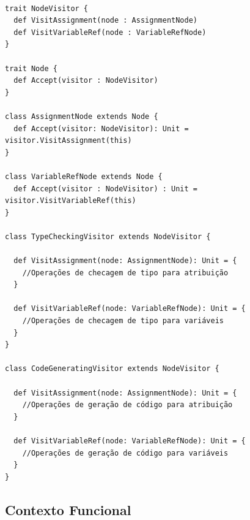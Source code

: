 \begin{lstlisting}[caption={Visitor Orientação a Objetos},label=oovisitor]

trait NodeVisitor {
  def VisitAssignment(node : AssignmentNode)
  def VisitVariableRef(node : VariableRefNode)
}

trait Node {
  def Accept(visitor : NodeVisitor)
}

class AssignmentNode extends Node {
  def Accept(visitor: NodeVisitor): Unit = visitor.VisitAssignment(this)
}

class VariableRefNode extends Node {
  def Accept(visitor : NodeVisitor) : Unit = visitor.VisitVariableRef(this)
}

class TypeCheckingVisitor extends NodeVisitor {

  def VisitAssignment(node: AssignmentNode): Unit = {
    //Operações de checagem de tipo para atribuição
  }

  def VisitVariableRef(node: VariableRefNode): Unit = {
    //Operações de checagem de tipo para variáveis
  }
}

class CodeGeneratingVisitor extends NodeVisitor {

  def VisitAssignment(node: AssignmentNode): Unit = {
    //Operações de geração de código para atribuição
  }

  def VisitVariableRef(node: VariableRefNode): Unit = {
    //Operações de geração de código para variáveis
  }
}

\end{lstlisting}

\subsection*{Contexto Funcional}

\begin{lstlisting}[caption={Visitor Funcional},label=fpvisitor]
    

    
\end{lstlisting}